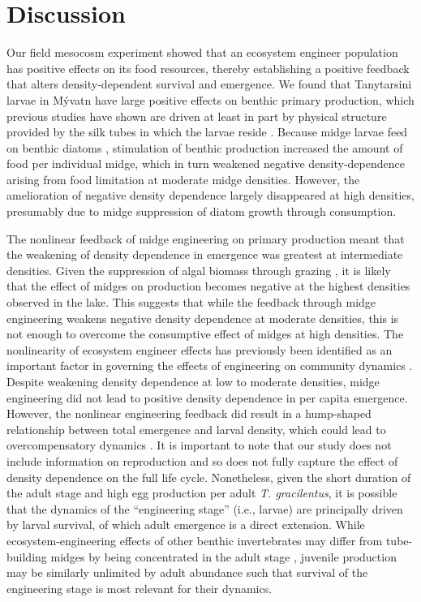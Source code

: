 
\section*{Discussion}

Our field mesocosm experiment showed that an ecosystem engineer population 
has positive effects on its food resources, 
thereby establishing a positive feedback 
that alters density-dependent survival and emergence. 
We found that Tanytarsini larvae in  M\'{y}vatn have large positive 
effects on benthic primary production,
which previous studies have shown are driven at least in part by physical 
structure provided by the silk tubes in which the larvae reside 
\citep{hoelker2015, phillips2019}.
Because midge larvae feed on benthic diatoms \citep{ingvason2004},
stimulation of benthic production increased the amount of food per individual midge,
which in turn weakened negative density-dependence arising from food limitation
at moderate midge densities.
However, the amelioration of negative density dependence largely disappeared at high densities,
presumably due to midge suppression of diatom growth through consumption.

The nonlinear feedback of midge engineering on primary production meant 
that the weakening of density dependence in emergence was greatest at intermediate densities. 
Given the suppression of algal biomass through grazing \citep{einarsson2016},
it is likely that the effect of midges on production becomes negative
at the highest densities observed in the lake.
This suggests that while the feedback through midge engineering weakens 
negative density dependence at moderate densities, 
this is not enough to overcome the consumptive effect of midges at high densities. 
The nonlinearity of ecosystem engineer effects has previously been identified 
as an important factor in governing the effects of engineering on community dynamics 
\citep{bozec2013}.
Despite weakening density dependence at low to moderate densities,
midge engineering did not lead to positive density dependence in per capita emergence.
However, the nonlinear engineering feedback did result in a hump-shaped relationship
between total emergence and larval density, which could lead to overcompensatory dynamics
\citep{turchin2003, cuddington2009}.
It is important to note that our study does not include information on reproduction
and so does not fully capture the effect of density  dependence on the full life cycle.
Nonetheless, given the short duration of the adult stage and high egg production per adult 
\emph{T. gracilentus}, 
it is possible that the dynamics of the ``engineering stage'' (i.e., larvae)
are principally driven by larval survival, of which adult emergence is a direct extension.
While ecosystem-engineering effects of other benthic invertebrates may differ from 
tube-building midges by being concentrated in the adult stage 
\citep[e.g. mussels;][]{largaespada2012},
juvenile production may be similarly unlimited by adult abundance such that 
survival of the engineering stage is most relevant for their dynamics.

